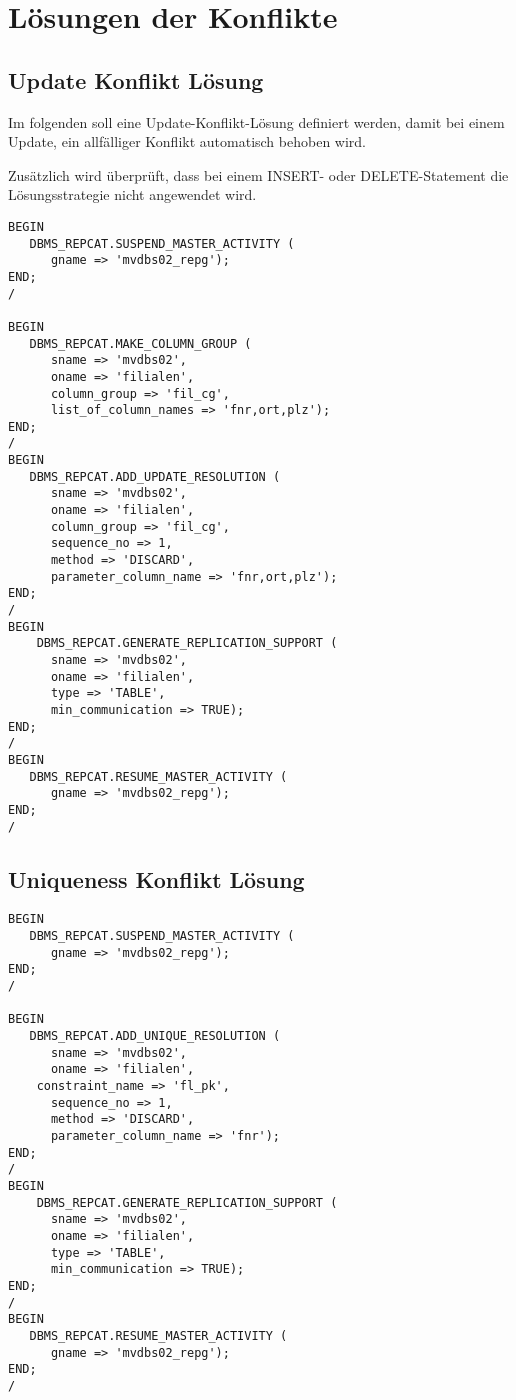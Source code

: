 \documentclass[a4paper,10pt,titlepage=false]{scrreprt}
\begin{document}
\section{Lösungen der Konflikte} %
\label{sec:l_sungen_der_konflikte}

\subsection{Update Konflikt Lösung}
Im folgenden soll eine Update-Konflikt-Lösung definiert werden, damit bei einem Update, ein allfälliger Konflikt automatisch behoben wird.

Zusätzlich wird überprüft, dass bei einem INSERT- oder DELETE-Statement die Lösungsstrategie nicht angewendet wird.
\begin{lstlisting}[style=sql, title=Definiton der Update-Konflikt-Lösung als repadmin auf telesto]
BEGIN
   DBMS_REPCAT.SUSPEND_MASTER_ACTIVITY (
      gname => 'mvdbs02_repg');
END;
/

BEGIN
   DBMS_REPCAT.MAKE_COLUMN_GROUP (
      sname => 'mvdbs02',
      oname => 'filialen',
      column_group => 'fil_cg',
      list_of_column_names => 'fnr,ort,plz');
END;
/
BEGIN
   DBMS_REPCAT.ADD_UPDATE_RESOLUTION (
      sname => 'mvdbs02',
      oname => 'filialen',
      column_group => 'fil_cg',
      sequence_no => 1,
      method => 'DISCARD',
      parameter_column_name => 'fnr,ort,plz');
END;
/
BEGIN 
    DBMS_REPCAT.GENERATE_REPLICATION_SUPPORT (
      sname => 'mvdbs02',
      oname => 'filialen',
      type => 'TABLE',
      min_communication => TRUE); 
END;
/
BEGIN
   DBMS_REPCAT.RESUME_MASTER_ACTIVITY (
      gname => 'mvdbs02_repg');
END;
/
\end{lstlisting}

\subsection{Uniqueness Konflikt Lösung}
\begin{lstlisting}[style=sql, title=Definition der Uniqueness-Konflikt-Lösung als repadmin auf telesto]
BEGIN
   DBMS_REPCAT.SUSPEND_MASTER_ACTIVITY (
      gname => 'mvdbs02_repg');
END;
/

BEGIN
   DBMS_REPCAT.ADD_UNIQUE_RESOLUTION (
      sname => 'mvdbs02',
      oname => 'filialen',
    constraint_name => 'fl_pk',
      sequence_no => 1,
      method => 'DISCARD',
      parameter_column_name => 'fnr');
END;
/
BEGIN 
    DBMS_REPCAT.GENERATE_REPLICATION_SUPPORT (
      sname => 'mvdbs02',
      oname => 'filialen',
      type => 'TABLE',
      min_communication => TRUE); 
END;
/
BEGIN
   DBMS_REPCAT.RESUME_MASTER_ACTIVITY (
      gname => 'mvdbs02_repg');
END;
/
\end{lstlisting}
\end{document}
